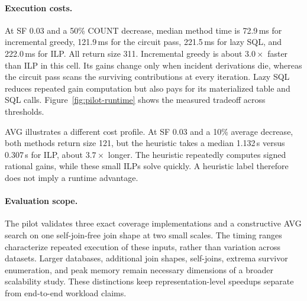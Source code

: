 \paragraph{Execution costs.}
At SF 0.03 and a 50\% COUNT decrease, median method time is 72.9\,ms for
incremental greedy, 121.9\,ms for the circuit pass, 221.5\,ms for lazy
SQL, and 222.0\,ms for ILP. All return size 311. Incremental greedy is
about $3.0\times$ faster than ILP in this cell. Its gains change only when
incident derivations die, whereas the circuit pass scans the surviving
contributions at every iteration. Lazy SQL reduces repeated gain
computation but also pays for its materialized table and SQL calls.
Figure~\ref{fig:pilot-runtime} shows the measured tradeoff across thresholds.

AVG illustrates a different cost profile. At SF 0.03 and a 10\% average
decrease, both methods return size 121, but the heuristic takes a median
1.132\,s versus 0.307\,s for ILP, about $3.7\times$ longer. The heuristic
repeatedly computes signed rational gains, while these small ILPs solve
quickly. A heuristic label therefore does not imply a runtime advantage.

\paragraph{Evaluation scope.}
The pilot validates three exact coverage implementations and a constructive
AVG search on one self-join-free join shape at two small scales. The timing
ranges characterize repeated execution of these inputs, rather than
variation across datasets. Larger databases, additional join shapes,
self-joins, extrema survivor enumeration, and peak memory remain necessary
dimensions of a broader scalability study. These distinctions keep
representation-level speedups separate from end-to-end workload claims.
